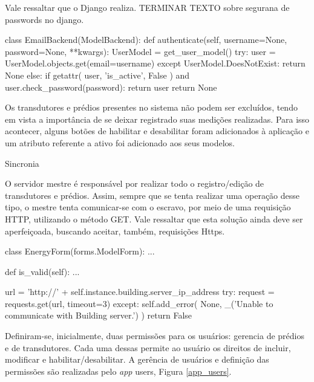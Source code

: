 Vale ressaltar que o Django realiza. TERMINAR TEXTO sobre segurana de passwords no django.

\begin{python}[caption={Corpo do método authenticate, classe EmailBackend.}, captionpos=b]
class EmailBackend(ModelBackend):
    def authenticate(self, username=None, password=None, **kwargs):
        UserModel = get_user_model()
        try:
            user = UserModel.objects.get(email=username)
        except UserModel.DoesNotExist:
            return None
        else:
            if getattr(
                user, 'is_active', False
            ) and user.check_password(password):
                return user
        return None
\end{python}

Os transdutores e prédios presentes no sistema não podem ser excluídos, tendo em vista a importância de se deixar registrado suas medições realizadas. Para isso acontecer, alguns botões de habilitar e desabilitar foram adicionados à aplicação e um atributo referente a ativo foi adicionado aos seus modelos.

Sincronia

O servidor mestre é responsável por realizar todo o registro/edição de transdutores e prédios. Assim, sempre que se tenta realizar uma operação desse tipo, o mestre tenta comunicar-se com o escravo, por meio de uma requisição HTTP, utilizando o método GET. Vale ressaltar que esta solução ainda deve ser aperfeiçoada, buscando aceitar, também, requisições Https.

\begin{python}[caption={Corpo do método is\_valid, classe EnergyForm.}, captionpos=b]
class EnergyForm(forms.ModelForm):
    ...

    def is_valid(self):
        ...

        url = 'http://' + self.instance.building.server_ip_address
        try:
            request = requests.get(url, timeout=3)
        except:
            self.add_error(
                None,
                _('Unable to communicate with Building server.')
            )
            return False
\end{python}

Definiram-se, inicialmente, duas permissões para os usuários: gerencia de prédios e de transdutores. Cada uma dessas permite ao usuário os direitos de incluir, modificar e habilitar/desabilitar. A gerência de usuários e definição das permissões são realizadas pelo \textit{app} users, Figura \ref{app_users}.

